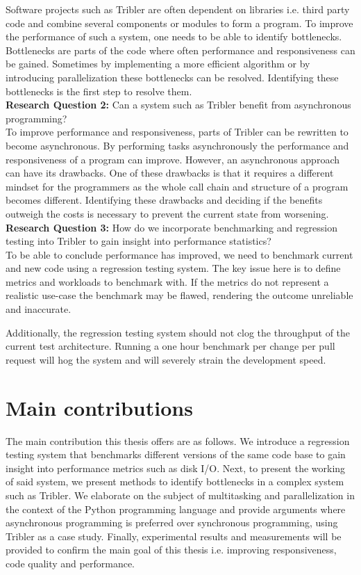 Software projects such as Tribler are often dependent on libraries i.e. third party code and combine several components or modules to form a program.
To improve the performance of such a system, one needs to be able to identify bottlenecks.
Bottlenecks are parts of the code where often performance and responsiveness can be gained. 
Sometimes by implementing a more efficient algorithm or by introducing parallelization these bottlenecks can be resolved.
Identifying these bottlenecks is the first step to resolve them.\\

\textbf{Research Question 2:} Can a system such as Tribler benefit from asynchronous programming?\\

To improve performance and responsiveness, parts of Tribler can be rewritten to become asynchronous.
By performing tasks asynchronously the performance and responsiveness of a program can improve.
However, an asynchronous approach can have its drawbacks. 
One of these drawbacks is that it requires a different mindset for the programmers as the whole call chain and structure of a program becomes different.
Identifying these drawbacks and deciding if the benefits outweigh the costs is necessary to prevent the current state from worsening. \\

\noindent
\textbf{Research Question 3:} How do we incorporate benchmarking and regression testing into Tribler to gain insight into performance statistics?\\

To be able to conclude performance has improved, we need to benchmark current and new code using a regression testing system.
The key issue here is to define metrics and workloads to benchmark with.
If the metrics do not represent a realistic use-case the benchmark may be flawed, rendering the outcome unreliable and inaccurate.

Additionally, the regression testing system should not clog the throughput of the current test architecture.
Running a one hour benchmark per change per pull request will hog the system and will severely strain the development speed.

\section{Main contributions}
The main contribution this thesis offers are as follows.
We introduce a regression testing system that benchmarks different versions of the same code base to gain insight into performance metrics such as disk I/O.
Next, to present the working of said system, we present methods to identify bottlenecks in a complex system such as Tribler. 
We elaborate on the subject of multitasking and parallelization in the context of the Python programming language and provide arguments where asynchronous programming is preferred over synchronous programming, using Tribler as a case study.
Finally, experimental results and measurements will be provided to confirm the main goal of this thesis i.e. improving responsiveness, code quality and performance.
